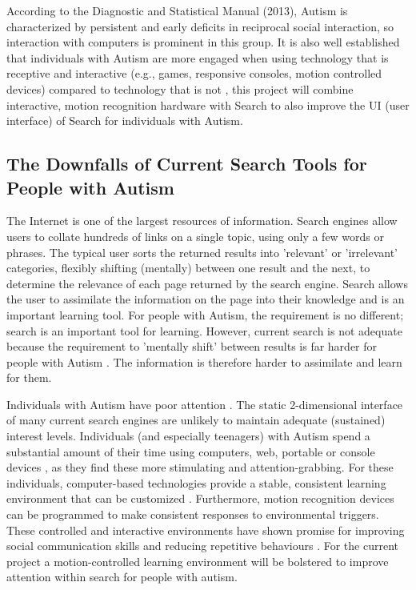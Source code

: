 \documentclass[a4paper, 10pt]{article}
\begin{document}
According to the Diagnostic and Statistical Manual (2013), Autism is characterized by persistent and early deficits in reciprocal social interaction, so interaction with computers is prominent in this group. It is also well established that individuals with Autism are more engaged when using technology that is receptive and interactive (e.g., games, responsive consoles, motion controlled devices) compared to technology that is not \cite{motioncontrollerforautism}, this project will combine interactive, motion recognition hardware with Search to also improve the UI (user interface) of Search for individuals with Autism.

\subsection{The Downfalls of Current Search Tools for People with Autism}\label{What should Search offer people with Autism}

The Internet is one of the largest resources of information. Search engines allow users to collate hundreds of links on a single topic, using only a few words or phrases. The typical user sorts the returned results into 'relevant' or 'irrelevant' categories, flexibly shifting (mentally) between one result and the next, to determine the relevance of each page returned by the search engine. Search allows the user to assimilate the information on the page into their knowledge and is an important learning tool. For people with Autism, the requirement is no different; search is an important tool for learning. However, current search is not adequate because the requirement to 'mentally shift' between results is far harder for people with Autism \cite{disengagement}. The information is therefore harder to assimilate and learn for them. 

Individuals with Autism have poor attention \cite{attention}. The static 2-dimensional interface of many current search engines are unlikely to maintain adequate (sustained) interest levels. Individuals (and especially teenagers) with Autism spend a substantial amount of their time using computers, web, portable or console devices \cite{Shane and Albert}, as they find these more stimulating and attention-grabbing. For these individuals, computer-based technologies provide a stable, consistent learning environment that can be customized \cite{moore}. Furthermore, motion recognition devices can be programmed to make consistent responses to environmental triggers. These controlled and interactive environments have shown promise for improving social communication skills and reducing repetitive behaviours \cite{gameshealth}. For the current project a motion-controlled learning environment will be bolstered to improve attention within search for people with autism. 
\end{document}
